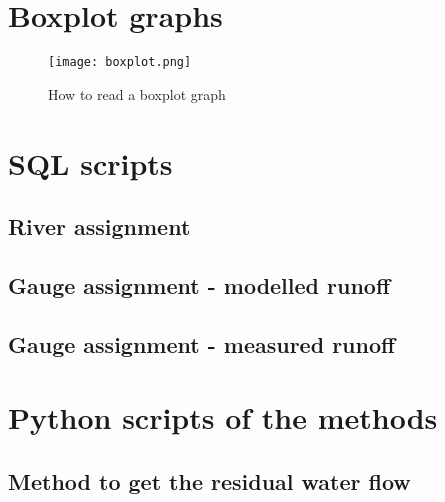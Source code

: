 \appendix
\chapter{Boxplot graphs}
\label{app:boxplot}

\begin{figure}[H]
\centering
\texttt{[image: boxplot.png]}
\caption[How to read a boxplot graph]{How to read a boxplot graph \cite{stk_boxplot}}
\label{boxlot}
\end{figure}

\chapter{SQL scripts}
\section{River assignment}
\label{app:sql_assign_river}


\newpage
\section{Gauge assignment - modelled runoff}
\label{app:sql_assign_watergap}



\newpage
\section{Gauge assignment - measured runoff}
\label{app:sql_assign_gauge}



\chapter{Python scripts of the methods}
\section{Method to get the residual water flow}
\label{app:get_dV_res}


\newpage
